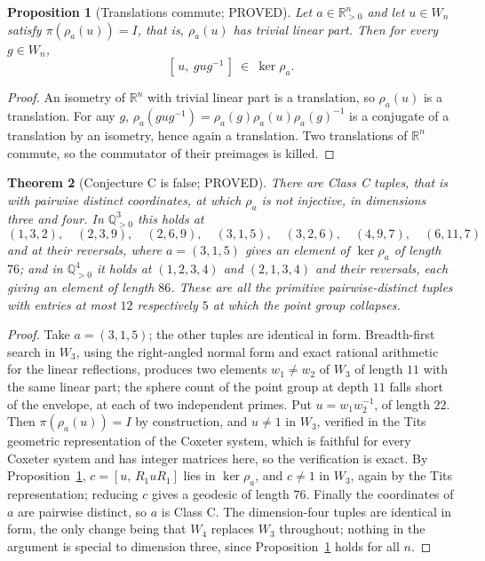 \documentclass[11pt]{article}
\newtheorem{theorem}{Theorem}[section]
\newtheorem{proposition}[theorem]{Proposition}
\theoremstyle{definition}
\theoremstyle{remark}
\theoremstyle{definition}
\newcommand{\Q}{\mathbb{Q}}
\newcommand{\R}{\mathbb{R}}
\begin{document}
\begin{proposition}[Translations commute; PROVED]\label{prop:transtrick}
Let $a\in\R_{>0}^n$ and let $u\in W_n$ satisfy $\pi(\rho_a(u))=I$, that is, $\rho_a(u)$ has
trivial linear part. Then for every $g\in W_n$,
\[
   [\,u,\ gug^{-1}\,]\ \in\ \ker\rho_a .
\]
\end{proposition}

\begin{proof}
An isometry of $\R^n$ with trivial linear part is a translation, so $\rho_a(u)$ is a translation.
For any $g$, $\rho_a(gug^{-1})=\rho_a(g)\rho_a(u)\rho_a(g)^{-1}$ is a conjugate of a translation
by an isometry, hence again a translation. Two translations of $\R^n$ commute, so the commutator
of their preimages is killed.
\end{proof}

\begin{theorem}[Conjecture C is false; PROVED]\label{thm:masterCfalse}
There are Class C tuples, that is with pairwise distinct coordinates, at which $\rho_a$ is not
injective, in dimensions three and four. In $\Q_{>0}^3$ this holds at
\[
 (1,3,2),\quad (2,3,9),\quad (2,6,9),\quad (3,1,5),\quad (3,2,6),\quad (4,9,7),\quad (6,11,7)
\]
and at their reversals, where $a=(3,1,5)$ gives an element of $\ker\rho_a$ of length $76$; and in
$\Q_{>0}^4$ it holds at $(1,2,3,4)$ and $(2,1,3,4)$ and their reversals, each giving an element of
length $86$. These are all the primitive pairwise-distinct tuples with entries at most $12$
respectively $5$ at which the point group collapses.
\end{theorem}

\begin{proof}
Take $a=(3,1,5)$; the other tuples are identical in form. Breadth-first search in $W_3$, using
the right-angled normal form and exact rational arithmetic for the linear reflections, produces
two elements $w_1\ne w_2$ of $W_3$ of length $11$ with the same linear part; the sphere count of
the point group at depth $11$ falls short of the envelope, at each of two independent primes.
Put $u=w_1w_2^{-1}$, of length $22$. Then $\pi(\rho_a(u))=I$ by construction, and $u\ne1$ in
$W_3$, verified in the Tits geometric representation of the Coxeter system, which is faithful for
every Coxeter system and has integer matrices here, so the verification is exact. By
Proposition~\ref{prop:transtrick}, $c=[u,\,R_1uR_1]$ lies in $\ker\rho_a$, and $c\ne1$ in $W_3$,
again by the Tits representation; reducing $c$ gives a geodesic of length $76$. Finally the
coordinates of $a$ are pairwise distinct, so $a$ is Class C. The dimension-four tuples are
identical in form, the only change being that $W_4$ replaces $W_3$ throughout; nothing in the
argument is special to dimension three, since Proposition~\ref{prop:transtrick} holds for all
$n$.
\end{proof}
\end{document}
